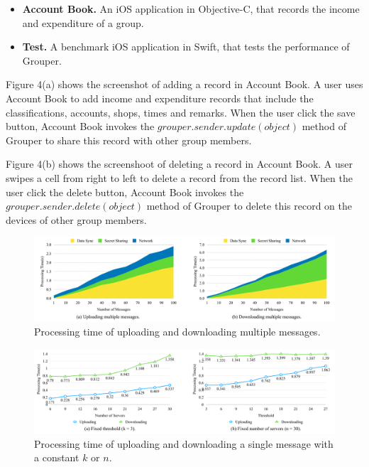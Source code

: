\documentclass{sig-alternate-05-2015}
\begin{document}
\begin{itemize}
	\setlength{\itemsep}{1pt}
	\setlength{\parskip}{0pt}
	\setlength{\parsep}{0pt}
	\item \textbf{Account Book.} An iOS application in Objective-C, that records the income and expenditure of a group.
	\item \textbf{Test.} A benchmark iOS application in Swift, that tests the performance of Grouper.
\end{itemize}

Figure 4(a) shows the screenshot of adding a record in Account Book. 
A user uses Account Book to add income and expenditure records that include the classifications, accounts, shops, times and remarks. 
When the user click the save button, Account Book invokes the $grouper.sender.update(object)$ method of Grouper to share this record with other group members.

Figure 4(b) shows the screenshoot of deleting a record in Account Book. 
A user swipes a cell from right to left to delete a record from the record list. 
When the user click the delete button, Account Book invokes the $grouper.sender.delete(object)$ method of Grouper to delete this record on the devices of other group members.

\begin{figure}[t]
	\centering
	\includegraphics[scale=0.133]{multiple_messages}
	\caption{Processing time of uploading and downloading multiple messages.}
\end{figure}

\begin{figure}[t]
	\centering
	\includegraphics[scale=0.133]{constant_k_n}
	\caption{Processing time of uploading and downloading a single message with a constant ${k}$ or ${n}$.}
\end{figure}
\end{document}
